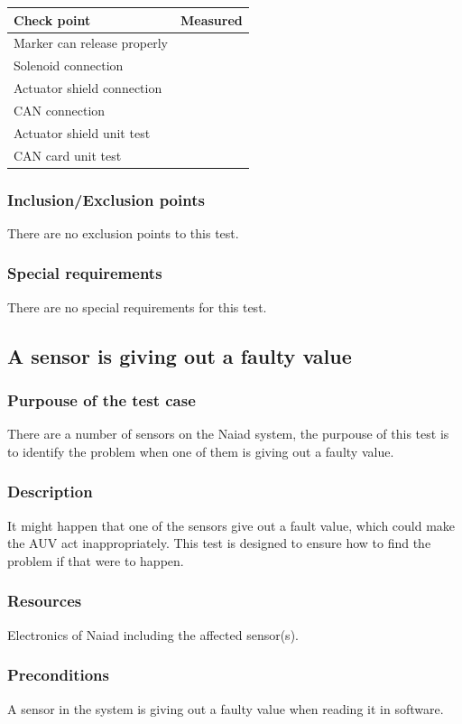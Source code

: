 \begin{tabular}{| l | c |}
\hline
Check point & Measured \\ \hline
Marker can release properly &  \\ \hline
Solenoid connection &  \\ \hline
Actuator shield connection &  \\ \hline
CAN connection & \\ \hline
Actuator shield unit test & \\ \hline
CAN card unit test & \\ \hline
\end{tabular} 
\subsubsection*{Inclusion/Exclusion points}
There are no exclusion points to this test. 
\subsubsection*{Special requirements}
There are no special requirements for this test. 

\subsection{A sensor is giving out a faulty value}
\subsubsection*{Purpouse of the test case}
There are a number of sensors on the Naiad system, the purpouse of this test is to identify the problem when one of them is giving out a faulty value. 
\subsubsection*{Description}
It might happen that one of the sensors give out a fault value, which could make the AUV act inappropriately. This test is designed to ensure how to find the problem if that were to happen. 
\subsubsection*{Resources}
Electronics of Naiad including the affected sensor(s).
\subsubsection*{Preconditions}
A sensor in the system is giving out a faulty value when reading it in software. 
